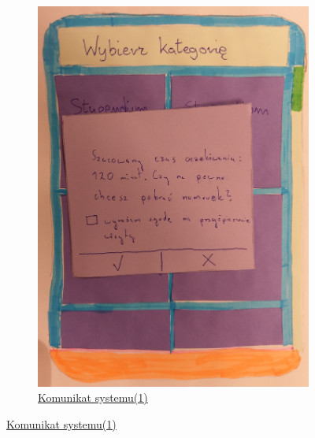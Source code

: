 \documentclass[12pt]{article}
\begin{document}
\begin{figure}[h!]
\begin{subfigure}[ba]{1\linewidth}
	\includegraphics[width=\linewidth]{zdj/3.jpg}
	\caption{\underline{Komunikat systemu(1)}}
\end{subfigure}
\end{figure}
\end{document}
